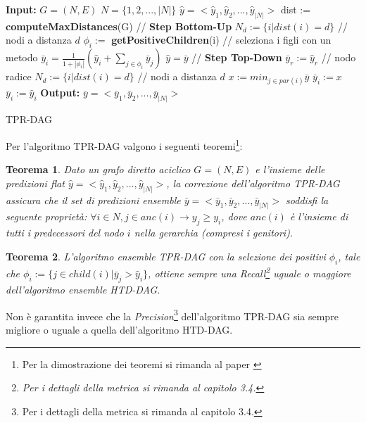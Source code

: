 \documentclass[12pt]{report}
\newtheorem{theo}{Teorema}
\begin{document}
\begin{algorithm}[!htp]
\begin{algorithmic}[1]
\State \textbf{Input: }
\State $G = (N, E)$
\State $N = \{1, 2, ..., |N|\} $ 
\State $\hat{y} = <\hat{y}_1, \hat{y}_2, ...,\hat{y}_{|N|}>$
\State dist := \textbf{computeMaxDistances}(G)
\State // \textbf{Step Bottom-Up}
\State $N_d := \{i|dist(i) = d\}$ // nodi a distanza $d$ 
\State $\phi_i :=$  \textbf{getPositiveChildren}(i) // seleziona i figli con un metodo
\State $\bar{y}_i = \frac{1}{1 + |\phi_i|} (\hat{y}_i + \sum_{j \in \phi_i} \bar{y}_j)$
\EndFor
\EndFor
\State $\hat{y} = \bar{y}$
\State // \textbf{Step Top-Down}
\State $\bar{y}_r := \hat{y}_r$  // nodo radice 
\State $N_d := \{i|dist(i) = d\}$ // nodi a distanza $d$ 
\State $x:= min_{j \in par(i)} \bar{y}$
\State $\bar{y}_i := x $
\Else
\State $\bar{y}_i := \hat{y}_i $
\EndIf
\EndFor
\EndFor
\EndProcedure
\State \textbf{Output: }
\State $\bar{y} = <\bar{y}_1, \bar{y}_2, ...,\bar{y}_{|N|}>$
\end{algorithmic}
\caption{TPR-DAG}
\label{tpr-dag-code}
\end{algorithm}

Per l'algoritmo TPR-DAG valgono i seguenti teoremi\footnote{\footnotesize{Per la dimostrazione dei teoremi si rimanda al paper \cite{notaro1}}}:

\begin{theo}
Dato un grafo diretto aciclico $G = (N, E)$ e l'insieme delle predizioni flat $\hat{y} = <\hat{y}_1, \hat{y}_2, \dots, \hat{y}_{|N|}>$, la correzione dell'algoritmo TPR-DAG assicura che il set di predizioni ensemble $\bar{y} = <\bar{y}_1, \bar{y}_2, \dots, \bar{y}_{|N|}>$ soddisfi la seguente proprietà: $\forall i \in N, j \in anc(i) \rightarrow y_j \geq y_i$, dove $anc(i)$ è l'insieme di tutti i predecessori del nodo $i$ nella gerarchia (compresi i genitori).
\label{theo2}
\end{theo}

\begin{theo}
L'algoritmo ensemble TPR-DAG con la selezione dei positivi $\phi_i$, tale che $\phi_i := \{j \in child(i)|\bar{y}_j > \hat{y}_i\}$, ottiene sempre una Recall\footnote{\footnotesize{Per i dettagli della metrica si rimanda al capitolo 3.4.}} uguale o maggiore dell'algoritmo ensemble HTD-DAG.
\label{theo3}
\end{theo}
Non è garantita invece che la \emph{Precision}\footnote{\footnotesize{Per i dettagli della metrica si rimanda al capitolo 3.4.}}  dell'algoritmo TPR-DAG sia sempre migliore o uguale a quella dell'algoritmo HTD-DAG.
\end{document}
